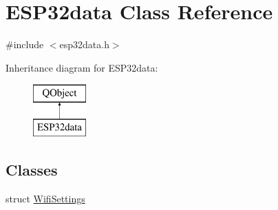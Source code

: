 \hypertarget{class_e_s_p32data}{}\section{E\+S\+P32data Class Reference}
\label{class_e_s_p32data}


{\ttfamily \#include $<$esp32data.\+h$>$}

Inheritance diagram for E\+S\+P32data\+:\begin{figure}[H]
\begin{center}
\leavevmode
\includegraphics[height=2.000000cm]{class_e_s_p32data}
\end{center}
\end{figure}
\subsection*{Classes}
\begin{DoxyCompactItemize}
\item 
struct \hyperlink{struct_e_s_p32data_1_1_wifi_settings}{Wifi\+Settings}
\end{DoxyCompactItemize}
